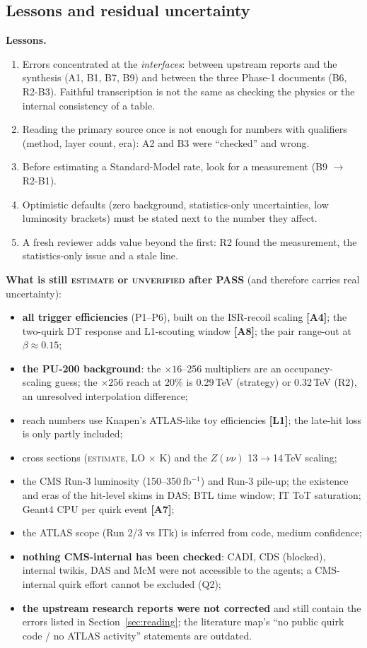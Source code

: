 \documentclass[11pt,a4paper]{article}
\newcommand{\EST}{\textsc{estimate}}
\newcommand{\UNV}{\textsc{unverified}}
\newcommand{\lab}[1]{\textbf{[#1]}}
\begin{document}
\subsection{Lessons and residual uncertainty}
\textbf{Lessons.}
\begin{enumerate}[itemsep=1pt]
\item Errors concentrated at the \emph{interfaces}: between upstream reports and the synthesis (A1, B1, B7, B9) and between the three Phase-1 documents (B6, R2-B3). Faithful transcription is not the same as checking the physics or the internal consistency of a table.
\item Reading the primary source once is not enough for numbers with qualifiers (method, layer count, era): A2 and B3 were ``checked'' and wrong.
\item Before estimating a Standard-Model rate, look for a measurement (B9 $\to$ R2-B1).
\item Optimistic defaults (zero background, statistics-only uncertainties, low luminosity brackets) must be stated next to the number they affect.
\item A fresh reviewer adds value beyond the first: R2 found the measurement, the statistics-only issue and a stale line.
\end{enumerate}

\begin{caution}
\textbf{What is still \EST{} or \UNV{} after PASS} (and therefore carries real uncertainty):
\begin{itemize}[leftmargin=1.2em,itemsep=1pt]
\item \textbf{all trigger efficiencies} (P1--P6), built on the ISR-recoil scaling \lab{A4}; the two-quirk DT response and L1-scouting window \lab{A8}; the pair range-out at $\beta\approx0.15$;
\item \textbf{the PU-200 background}: the $\times16$--256 multipliers are an occupancy-scaling guess; the $\times256$ reach at 20\% is 0.29\,TeV (strategy) or 0.32\,TeV (R2), an unresolved interpolation difference;
\item reach numbers use Knapen's ATLAS-like toy efficiencies \lab{L1}; the late-hit loss is only partly included;
\item cross sections (\EST, LO $\times$ K) and the $Z(\nu\nu)$ 13$\to$14\,TeV scaling;
\item the CMS Run-3 luminosity (150--350\,fb$^{-1}$) and Run-3 pile-up; the existence and eras of the hit-level skims in DAS; BTL time window; IT ToT saturation; Geant4 CPU per quirk event \lab{A7};
\item the ATLAS scope (Run 2/3 vs ITk) is inferred from code, medium confidence;
\item \textbf{nothing CMS-internal has been checked}: CADI, CDS (blocked), internal twikis, DAS and McM were not accessible to the agents; a CMS-internal quirk effort cannot be excluded (Q2);
\item \textbf{the upstream research reports were not corrected} and still contain the errors listed in Section~\ref{sec:reading}; the literature map's ``no public quirk code / no ATLAS activity'' statements are outdated.
\end{itemize}
\end{caution}
\end{document}
